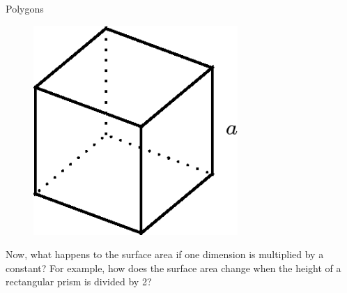 \begin{exercises}{Polygons}
\begin{enumerate}[noitemsep, label=\textbf{\arabic*}. ]
    \setcounter{subfigure}{0}


	\begin{figure}[H] %
    \begin{center}
    \label{m39357*id63117!!!underscore!!!media}\label{m39357*id63117!!!underscore!!!printimage}\includegraphics[height=300px]{col11306.imgs/m39357_MG10C14_007.png} %
        
      \vspace{2pt}
    \vspace{.1in}
    
    \end{center}

 \end{figure}   

    \addtocounter{footnote}{-0}
            \end{enumerate}
        
        

        \label{m39357*id63133}Now, what happens to the surface area if one dimension is multiplied by a constant? For example, how does the surface area change when the height of a rectangular prism is divided by 2?\par 
 \label{m39357*is08324}       
    \setcounter{subfigure}{0}



\end{exercises}
